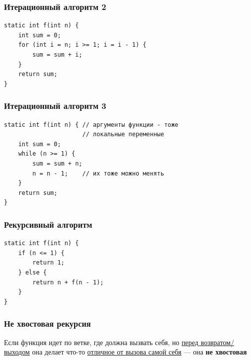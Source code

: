 {\begin{frame}[fragile]
  \frametitle{Итерационный алгоритм 2}
  \begin{verbatim}
static int f(int n) {
    int sum = 0;
    for (int i = n; i >= 1; i = i - 1) {
        sum = sum + i;
    }
    return sum;
}
  \end{verbatim}
\end{frame}

\begin{frame}[fragile]
  \frametitle{Итерационный алгоритм 3}
  \begin{verbatim}
static int f(int n) { // аргументы функции - тоже
                      // локальные переменные
    int sum = 0;
    while (n >= 1) {
        sum = sum + n;
        n = n - 1;    // их тоже можно менять
    }
    return sum;
}
  \end{verbatim}
\end{frame}

\begin{frame}[fragile]
  \frametitle{Рекурсивный алгоритм}
  \begin{verbatim}
static int f(int n) {
    if (n <= 1) {
        return 1;
    } else {
        return n + f(n - 1);
    }
}
  \end{verbatim}
\end{frame}



\begin{frame}[fragile]
  \frametitle{Не хвостовая рекурсия}
  Если функция идет по ветке, где должна вызвать себя, но \underline{перед возвратом/выходом} она делает что-то \underline{отличное от вызова самой себя} --- она \textbf{не хвостовая}


\end{frame}}

